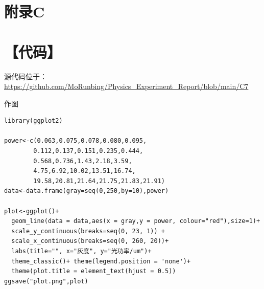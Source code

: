 \documentclass[10pt,a4paper,twoside,UTF8]{ctexart}
\begin{document}
\begin{table}[htbp]
	\centering
	\caption{Output}
	\label{tab:s3}
  \end{table}
  
  

\newpage
\section*{\LARGE 附录C}
\section*{【代码】}
源代码位于：\url{https://github.com/MoRunbing/Physics_Experiment_Report/blob/main/C7}

作图
\begin{lstlisting}	
library(ggplot2)

power<-c(0.063,0.075,0.078,0.080,0.095,
		0.112,0.137,0.151,0.235,0.444,
		0.568,0.736,1.43,2.18,3.59,
		4.75,6.92,10.02,13.51,16.74,
		19.58,20.81,21.64,21.75,21.83,21.91)
data<-data.frame(gray=seq(0,250,by=10),power)

plot<-ggplot()+
  geom_line(data = data,aes(x = gray,y = power, colour="red"),size=1)+
  scale_y_continuous(breaks=seq(0, 23, 1)) +
  scale_x_continuous(breaks=seq(0, 260, 20))+
  labs(title="", x="灰度", y="光功率/um")+
  theme_classic()+ theme(legend.position = 'none')+
  theme(plot.title = element_text(hjust = 0.5))
ggsave("plot.png",plot)
\end{lstlisting}
\end{document}
